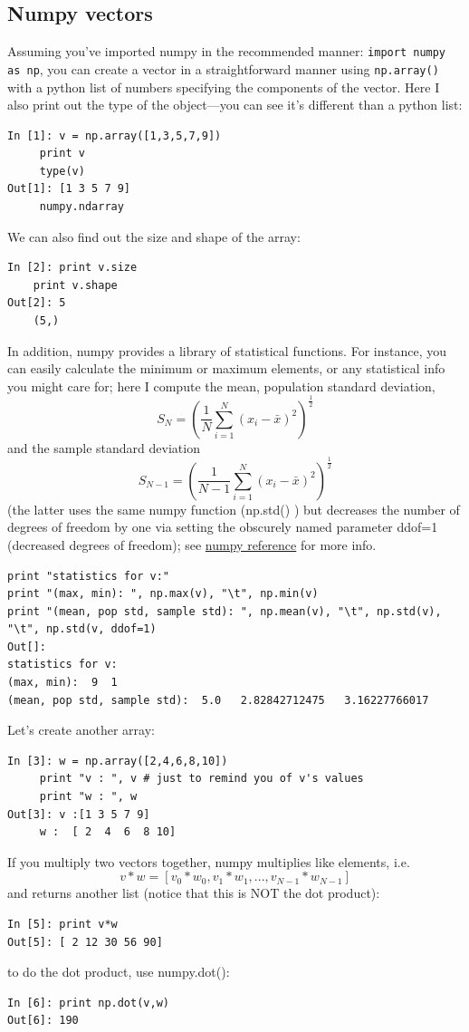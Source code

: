 \subsection{Numpy vectors}\label{subsec:vectors}

Assuming you've imported numpy in the recommended manner:
\lstinline{import numpy as np}, you can create a vector in a straightforward 
manner using \lstinline{np.array()} with a python list of numbers specifying the components of the vector.
Here I also print out the type of the object---you can see it's different than a python list:
\begin{lstlisting}
In [1]: v = np.array([1,3,5,7,9])
	 print v 
	 type(v)
Out[1]:	[1 3 5 7 9]
	 numpy.ndarray	
\end{lstlisting}
We can also find out the size and shape of the array:
\begin{lstlisting}
In [2]:	print v.size
	print v.shape
Out[2]:	5
	(5,)	
\end{lstlisting}
In addition, numpy provides a library of statistical functions. For instance, you can easily
calculate the minimum or maximum elements, or any statistical info you might care for; 
here I compute the mean, population standard deviation,  
$$\displaystyle  S_N = \left(\frac{1}{N}\sum_{i=1}^{N} (x_i - \bar{x})^2\right)^\frac{1}{2} $$
and the sample standard deviation  
$$\displaystyle  S_{N-1} = \left(\frac{1}{N-1}\sum_{i=1}^{N} (x_i - \bar{x})^2\right)^\frac{1}{2} $$
(the latter uses the same numpy function (np.std() ) but decreases the number of degrees of freedom by one via setting the obscurely named parameter ddof=1 (decreased degrees of freedom);  
see \href{http://docs.scipy.org/doc/numpy/reference/routines.statistics.html}{numpy reference} for more info.
\begin{lstlisting}
print "statistics for v:"
print "(max, min): ", np.max(v), "\t", np.min(v)
print "(mean, pop std, sample std): ", np.mean(v), "\t", np.std(v), "\t", np.std(v, ddof=1)
Out[]:
statistics for v:
(max, min):  9 	1
(mean, pop std, sample std):  5.0 	2.82842712475 	3.16227766017
\end{lstlisting}


Let's create another array:
\begin{lstlisting}
In [3]:	w = np.array([2,4,6,8,10])
	 print "v : ", v # just to remind you of v's values
	 print "w : ", w
Out[3]:	v :[1 3 5 7 9]
	 w :  [ 2  4  6  8 10]	
\end{lstlisting}
If you multiply two vectors together, numpy multiplies like elements, i.e.  
$$ v * w  = [ v_0 * w_0, v_1 * w_1, ..., v_{N-1} * w_{N-1} ] $$
and returns another list (notice that this is NOT the dot product):
\begin{lstlisting}
In [5]:	print v*w
Out[5]: [ 2 12 30 56 90]
\end{lstlisting}
to do the dot product, use numpy.dot():
\begin{lstlisting}
In [6]: print np.dot(v,w)
Out[6]: 190		
\end{lstlisting}

